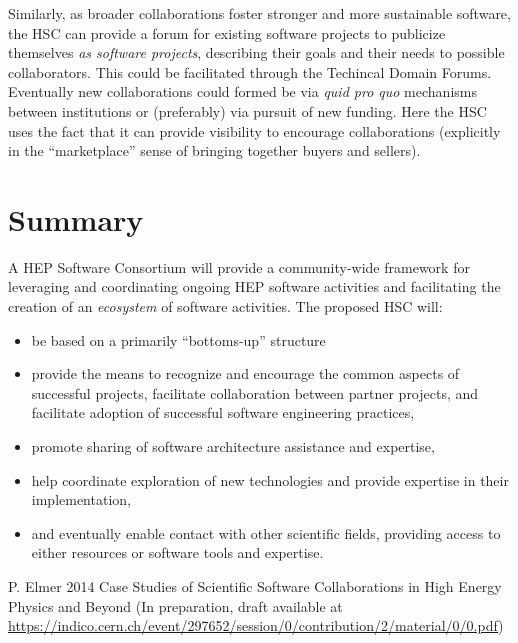 \documentclass[12pt,letterpaper,fleqn]{article}
\begin{document}
Similarly, as broader collaborations foster stronger and more sustainable
software, the HSC can provide a forum for existing software projects to 
publicize themselves {\em as software projects}, describing their goals and 
their needs to possible collaborators. This could be facilitated through the Techincal Domain Forums.  Eventually new collaborations could 
formed be via {\em quid pro quo} mechanisms between institutions or 
(preferably) via pursuit of new funding. Here the HSC uses the fact
that it can provide visibility to encourage collaborations (explicitly
in the ``marketplace'' sense of bringing together buyers and sellers).




\section{Summary} 

A HEP Software Consortium will provide a community-wide framework
for leveraging and coordinating ongoing HEP software activities and facilitating the creation of an {\it ecosystem} of software activities.   The proposed HSC will:
\begin{itemize}
\item be based on a primarily ``bottoms-up'' structure
\item provide the means to recognize and encourage the common aspects
of successful projects, facilitate collaboration between partner
projects, and facilitate adoption of successful software engineering
practices,
\item promote sharing of software architecture assistance and expertise,
\item help coordinate exploration of new technologies and provide expertise in their implementation,
\item and eventually enable contact with other scientific fields,
providing access to either resources or software tools and expertise.
\end{itemize}



\newpage

\begin{thebibliography}{9}
 P. Elmer 2014 Case Studies of Scientific Software Collaborations in High Energy Physics and Beyond (In preparation, draft available at
\url{https://indico.cern.ch/event/297652/session/0/contribution/2/material/0/0.pdf})

\end{thebibliography}
\end{document}
